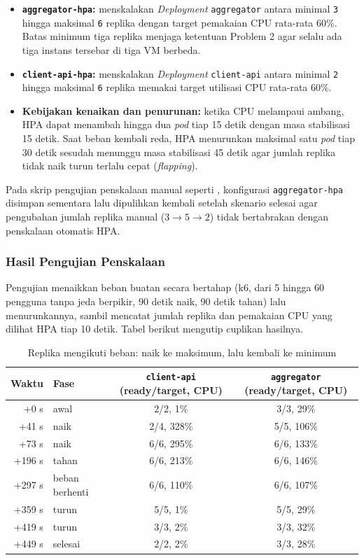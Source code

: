 \begin{itemize}
  \item \textbf{\texttt{aggregator-hpa}:} menskalakan \textit{Deployment} \texttt{aggregator} antara minimal \texttt{3} hingga maksimal \texttt{6} replika dengan target pemakaian CPU rata-rata $60\%$. Batas minimum tiga replika menjaga ketentuan Problem 2 agar selalu ada tiga instans tersebar di tiga VM berbeda.
  \item \textbf{\texttt{client-api-hpa}:} menskalakan \textit{Deployment} \texttt{client-api} antara minimal \texttt{2} hingga maksimal \texttt{6} replika memakai target utilisasi CPU rata-rata $60\%$.
  \item \textbf{Kebijakan kenaikan dan penurunan:} ketika CPU melampaui ambang, HPA dapat menambah hingga dua \textit{pod} tiap 15 detik dengan masa stabilisasi 15 detik. Saat beban kembali reda, HPA menurunkan maksimal satu \textit{pod} tiap 30 detik sesudah menunggu masa stabilisasi 45 detik agar jumlah replika tidak naik turun terlalu cepat (\textit{flapping}).
\end{itemize}

Pada skrip pengujian penskalaan manual seperti , konfigurasi \texttt{aggregator-hpa} disimpan sementara lalu dipulihkan kembali setelah skenario selesai agar pengubahan jumlah replika manual ($3 \to 5 \to 2$) tidak bertabrakan dengan penskalaan otomatis HPA.

\subsubsection{Hasil Pengujian Penskalaan}

Pengujian  menaikkan beban buatan secara bertahap (k6, dari 5 hingga 60 pengguna tanpa jeda berpikir, 90 detik naik, 90 detik tahan) lalu menurunkannya, sambil mencatat jumlah replika dan pemakaian CPU yang dilihat HPA tiap 10 detik. Tabel berikut mengutip cuplikan hasilnya.

\begin{table}[H]
  \centering
  \small
  \begin{tabular}{@{} r l c c @{}}
    \toprule
    \textbf{Waktu} & \textbf{Fase} & \textbf{\texttt{client-api} (ready/target, CPU)} & \textbf{\texttt{aggregator} (ready/target, CPU)} \\
    \midrule
    +0 s & awal & 2/2, 1\% & 3/3, 29\% \\
    +41 s & naik & 2/4, 328\% & 5/5, 106\% \\
    +73 s & naik & 6/6, 295\% & 6/6, 133\% \\
    +196 s & tahan & 6/6, 213\% & 6/6, 146\% \\
    +297 s & beban berhenti & 6/6, 110\% & 6/6, 107\% \\
    +359 s & turun & 5/5, 1\% & 5/5, 29\% \\
    +419 s & turun & 3/3, 2\% & 3/3, 32\% \\
    +449 s & selesai & 2/2, 2\% & 3/3, 28\% \\
    \bottomrule
  \end{tabular}
  \caption{Replika mengikuti beban: naik ke maksimum, lalu kembali ke minimum}
  \label{tab:hpa}
\end{table}

